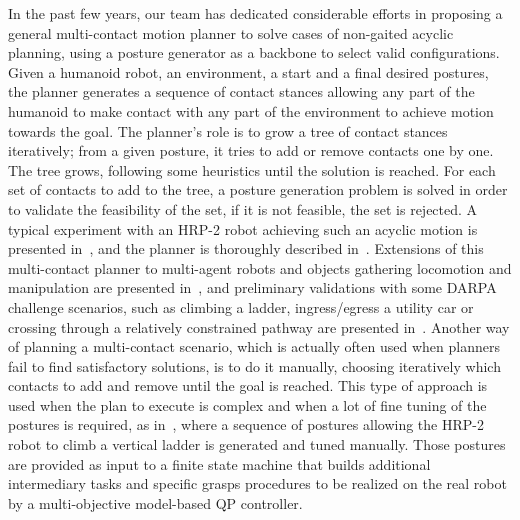 In the past few years, our team has dedicated considerable efforts in proposing a general multi-contact motion planner to solve cases of non-gaited acyclic planning, using a posture generator as a backbone to select valid configurations.
Given a humanoid robot, an environment, a start and a final desired postures, the planner generates a sequence of contact stances allowing any part of the humanoid to make contact with any part of the environment to achieve motion towards the goal.
The planner's role is to grow a tree of contact stances iteratively; from a given posture, it tries to add or remove contacts one by one.
The tree grows, following some heuristics until the solution is reached.
For each set of contacts to add to the tree, a posture generation problem is solved in order to validate the feasibility of the set, if it is not feasible, the set is rejected.
A typical experiment with an HRP-2 robot achieving such an acyclic motion is presented in~\cite{escande:iser:2008}, and the planner is thoroughly described in~\cite{escande:ras:2013}.
Extensions of this multi-contact planner to multi-agent robots and objects gathering locomotion and manipulation are presented in~\cite{bouyarmane:ar:2012}, and preliminary validations with some DARPA challenge scenarios, such as climbing a ladder, ingress/egress a utility car or crossing through a relatively constrained pathway are presented in~\cite{bouyarmane:humanoids:2012}.
Another way of planning a multi-contact scenario, which is actually often used when planners fail to find satisfactory solutions, is to do it manually, choosing iteratively which contacts to add and remove until the goal is reached.
This type of approach is used when the plan to execute is complex and when a lot of fine tuning of the postures is required, as in~\cite{vaillant:autonomousrobots:2016}, where a sequence of postures allowing the HRP-2 robot to climb a vertical ladder is generated and tuned manually.
Those postures are provided as input to a finite state machine that builds additional intermediary tasks and specific grasps procedures to be realized on the real robot by a multi-objective model-based QP controller.


